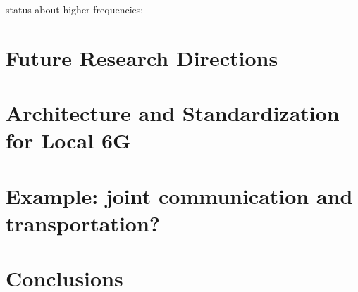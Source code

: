 \documentclass[journal,twocolumn]{IEEEtran}
\begin{document}
status about higher frequencies:

\section{Future Research Directions}
\section{Architecture and Standardization for Local 6G}




\section{Example: joint communication and transportation?}

\section{Conclusions}


\end{document}
